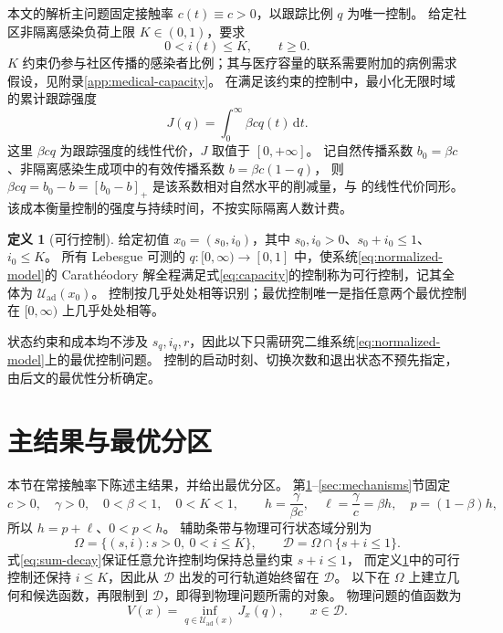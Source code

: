 \documentclass[11pt,a4paper,UTF8]{ctexart}
\theoremstyle{definition}
\newtheorem{definition}[theorem]{定义}
\newcommand{\Dcal}{\mathcal D}
\newcommand{\Uad}{\mathcal U_{\mathrm{ad}}}
\newcommand{\dd}{\,\mathrm d}
\begin{document}
本文的解析主问题固定接触率 $c(t)\equiv c>0$，以跟踪比例 $q$ 为唯一控制。
给定社区非隔离感染负荷上限 $K\in(0,1)$，要求
\begin{equation}
 0<i(t)\le K,\qquad t\ge0.
 \label{eq:capacity}
\end{equation}
$K$ 约束仍参与社区传播的感染者比例；其与医疗容量的联系需要附加的病例需求假设，见附录\ref{app:medical-capacity}。
在满足该约束的控制中，最小化无限时域的累计跟踪强度
\begin{equation}
 J(q)=\int_0^\infty\beta cq(t)\dd t.
 \label{eq:linear-cost}
\end{equation}
这里 $\beta cq$ 为跟踪强度的线性代价，$J$ 取值于 $[0,+\infty]$。
记自然传播系数 $b_0=\beta c$、非隔离感染生成项中的有效传播系数 $b=\beta c(1-q)$，
则 $\beta cq=b_0-b=[b_0-b]_+$ 是该系数相对自然水平的削减量，与 \citet{MicloSpiroWeibull2022} 的线性代价同形。
该成本衡量控制的强度与持续时间，不按实际隔离人数计费。

\begin{definition}[可行控制]
\label{def:admissible}
给定初值 $x_0=(s_0,i_0)$，其中 $s_0,i_0>0$、$s_0+i_0\le1$、$i_0\le K$。
所有 Lebesgue 可测的 $q:[0,\infty)\to[0,1]$ 中，使系统\eqref{eq:normalized-model}的
Carath\'eodory 解全程满足式\eqref{eq:capacity}的控制称为可行控制，记其全体为 $\Uad(x_0)$。
控制按几乎处处相等识别；最优控制唯一是指任意两个最优控制在 $[0,\infty)$ 上几乎处处相等。
\end{definition}

状态约束和成本均不涉及 $s_q,i_q,r$，因此以下只需研究二维系统\eqref{eq:normalized-model}上的最优控制问题。
控制的启动时刻、切换次数和退出状态不预先指定，由后文的最优性分析确定。

\section{主结果与最优分区}
\label{sec:main-results}

本节在常接触率下陈述主结果，并给出最优分区。
第\ref{sec:main-results}--\ref{sec:mechanisms}节固定
\begin{equation}
c>0,\quad\gamma>0,\quad0<\beta<1,\quad0<K<1,
\qquad h=\frac{\gamma}{\beta c},\quad\ell=\frac{\gamma}{c}=\beta h,\quad p=(1-\beta)h,
\label{eq:constants}
\end{equation}
所以 $h=p+\ell$、$0<p<h$。
辅助条带与物理可行状态域分别为
\[
\Omega=\{(s,i):s>0,\ 0<i\le K\},\qquad
\Dcal=\Omega\cap\{s+i\le1\}.
\]
式\eqref{eq:sum-decay}保证任意允许控制均保持总量约束 $s+i\le1$，
而定义\ref{def:admissible}中的可行控制还保持 $i\le K$，因此从 $\Dcal$ 出发的可行轨道始终留在 $\Dcal$。
以下在 $\Omega$ 上建立几何和候选函数，再限制到 $\Dcal$，即得到物理问题所需的对象。
物理问题的值函数为
\begin{equation}
V(x)=\inf_{q\in\Uad(x)}J_x(q),\qquad x\in\Dcal.
\label{eq:value-definition}
\end{equation}
\end{document}
